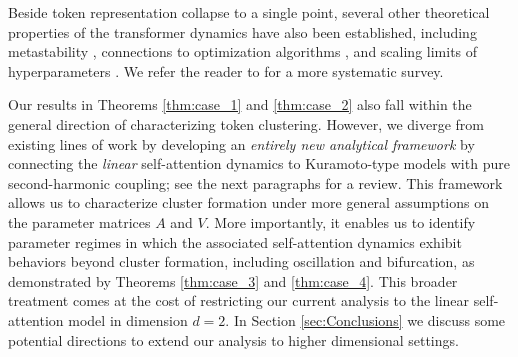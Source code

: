 \documentclass[10pt]{article}
\theoremstyle{definition}
\theoremstyle{definition}
\numberwithin{equation}{section}
\begin{document}
Beside token representation collapse to a single point, several other theoretical properties of the transformer dynamics have also been established, including metastability \cite{geshkovski2024dynamic,bruno2024emergence,bruno2025multiscale}, connections to optimization algorithms \cite{alcalde2025attention,alcalde2026quantifying}, and scaling limits of hyperparameters \cite{chen2025critical,bruno2026scaling,giorlandino2026two}.
We refer the reader to \cite{rigollet2025mean} for a more systematic survey.

Our results in Theorems \ref{thm:case_1} and \ref{thm:case_2} also fall within the general direction of characterizing token clustering.
However, we diverge from existing lines of work by developing an \emph{entirely new analytical framework} by connecting the \emph{linear} self-attention dynamics to Kuramoto-type models with pure second-harmonic coupling; see the next paragraphs for a review.
This framework allows us to characterize cluster formation under more general assumptions on the parameter matrices $A$ and $V$.
More importantly, it enables us to identify parameter regimes in which the associated self-attention dynamics exhibit behaviors beyond cluster formation, including oscillation and bifurcation, as demonstrated by Theorems \ref{thm:case_3} and \ref{thm:case_4}.
This broader treatment comes at the cost of restricting our current analysis to the linear self-attention model in dimension $d=2$. In Section \ref{sec:Conclusions} we discuss some potential directions to extend our analysis to higher dimensional settings.  
\end{document}

